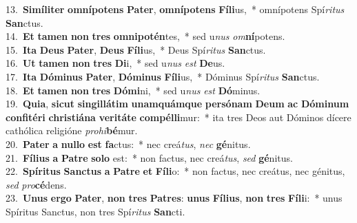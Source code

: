 {13.~}\textbf{Si}\textbf{mí}\textbf{li}\textbf{ter} \textbf{om}\textbf{ní}\textbf{po}\textbf{tens} \textbf{Pa}\textbf{ter}, \textbf{om}\textbf{ní}\textbf{po}\textbf{tens} \textbf{Fí}\textbf{li}us,~* omnípotens Spí\textit{ri}\textit{tus} \textbf{San}ctus.\\
{14.~}\textbf{Et} \textbf{ta}\textbf{men} \textbf{non} \textbf{tres} \textbf{om}\textbf{ni}\textbf{po}\textbf{tén}tes,~* sed u\textit{nus} \textit{om}\textbf{ní}potens.\\
{15.~}\textbf{I}\textbf{ta} \textbf{De}\textbf{us} \textbf{Pa}\textbf{ter}, \textbf{De}\textbf{us} \textbf{Fí}\textbf{li}us,~* Deus Spí\textit{ri}\textit{tus} \textbf{San}ctus.\\
{16.~}\textbf{Ut} \textbf{ta}\textbf{men} \textbf{non} \textbf{tres} \textbf{Di}i,~* sed u\textit{nus} \textit{est} \textbf{De}us.\\
{17.~}\textbf{I}\textbf{ta} \textbf{Dó}\textbf{mi}\textbf{nus} \textbf{Pa}\textbf{ter}, \textbf{Dó}\textbf{mi}\textbf{nus} \textbf{Fí}\textbf{li}us,~* Dóminus Spí\textit{ri}\textit{tus} \textbf{San}ctus.\\
{18.~}\textbf{Et} \textbf{ta}\textbf{men} \textbf{non} \textbf{tres} \textbf{Dó}\textbf{mi}ni,~* sed u\textit{nus} \textit{est} \textbf{Dó}minus.\\
{19.~}\textbf{Qui}\textbf{a}, \textbf{si}\textbf{cut} \textbf{sin}\textbf{gil}\textbf{lá}\textbf{tim} \textbf{u}\textbf{nam}\textbf{quám}\textbf{que} \textbf{per}\textbf{só}\textbf{nam} \textbf{De}\textbf{um} \textbf{ac} \textbf{Dó}\textbf{mi}\textbf{num} \textbf{con}\textbf{fi}\textbf{té}\textbf{ri} \textbf{chri}\textbf{sti}\textbf{á}\textbf{na} \textbf{ve}\textbf{ri}\textbf{tá}\textbf{te} \textbf{com}\textbf{pél}\textbf{li}mur:~* ita tres Deos aut Dóminos dícere cathólica religióne \textit{pro}\textit{hi}\textbf{bé}mur.\\
{20.~}\textbf{Pa}\textbf{ter} \textbf{a} \textbf{nul}\textbf{lo} \textbf{est} \textbf{fa}ctus:~* nec creá\textit{tus}, \textit{nec} \textbf{gé}nitus.\\
{21.~}\textbf{Fí}\textbf{li}\textbf{us} \textbf{a} \textbf{Pa}\textbf{tre} \textbf{so}\textbf{lo} est:~* non factus, nec creá\textit{tus}, \textit{sed} \textbf{gé}nitus.\\
{22.~}\textbf{Spí}\textbf{ri}\textbf{tus} \textbf{San}\textbf{ctus} \textbf{a} \textbf{Pa}\textbf{tre} \textbf{et} \textbf{Fí}\textbf{li}o:~* non factus, nec creátus, nec génitus, \textit{sed} \textit{pro}\textbf{cé}dens.\\
{23.~}\textbf{U}\textbf{nus} \textbf{er}\textbf{go} \textbf{Pa}\textbf{ter}, \textbf{non} \textbf{tres} \textbf{Pa}\textbf{tres}: \textbf{u}\textbf{nus} \textbf{Fí}\textbf{li}\textbf{us}, \textbf{non} \textbf{tres} \textbf{Fí}\textbf{li}i:~* unus Spíritus Sanctus, non tres Spí\textit{ri}\textit{tus} \textbf{San}cti.\\
